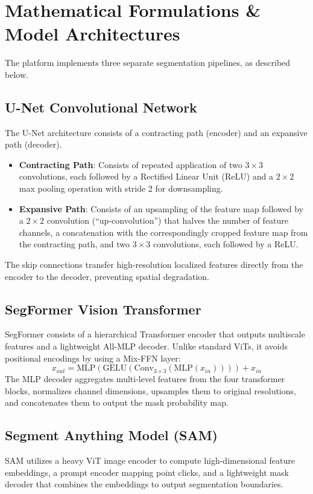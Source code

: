 \documentclass[11pt,journal,onecolumn]{IEEEtran}
\begin{document}
\section{Mathematical Formulations \& Model Architectures}
The platform implements three separate segmentation pipelines, as described below.

\subsection{U-Net Convolutional Network}
The U-Net architecture consists of a contracting path (encoder) and an expansive path (decoder).
\begin{itemize}
    \item \textbf{Contracting Path}: Consists of repeated application of two $3\times3$ convolutions, each followed by a Rectified Linear Unit (ReLU) and a $2\times2$ max pooling operation with stride 2 for downsampling.
    \item \textbf{Expansive Path}: Consists of an upsampling of the feature map followed by a $2\times2$ convolution (``up-convolution'') that halves the number of feature channels, a concatenation with the correspondingly cropped feature map from the contracting path, and two $3\times3$ convolutions, each followed by a ReLU.
\end{itemize}

The skip connections transfer high-resolution localized features directly from the encoder to the decoder, preventing spatial degradation.

\subsection{SegFormer Vision Transformer}
SegFormer consists of a hierarchical Transformer encoder that outputs multiscale features and a lightweight All-MLP decoder. Unlike standard ViTs, it avoids positional encodings by using a Mix-FFN layer:
\begin{equation}
x_{out} = \text{MLP}(\text{GELU}(\text{Conv}_{3\times3}(\text{MLP}(x_{in})))) + x_{in}
\end{equation}
The MLP decoder aggregates multi-level features from the four transformer blocks, normalizes channel dimensions, upsamples them to original resolutions, and concatenates them to output the mask probability map.

\subsection{Segment Anything Model (SAM)}
SAM utilizes a heavy ViT image encoder to compute high-dimensional feature embeddings, a prompt encoder mapping point clicks, and a lightweight mask decoder that combines the embeddings to output segmentation boundaries.
\end{document}
